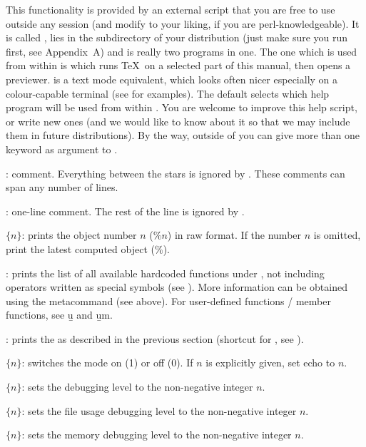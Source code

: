  This functionality is provided by an
external  script that you are free to use outside any  session
(and modify to your liking, if you are perl-knowledgeable). It is called
, lies in the  subdirectory of your distribution
(just make sure you run  first, see Appendix~A) and is
really two programs in one. The one which is used from within  is
 which runs \TeX\ on a selected part of this manual, then opens
a previewer.  is a text mode equivalent, which looks
often nicer especially on a colour-capable terminal (see
 for examples). The default  selects which
help program will be used from within . You are welcome to improve this
help script, or write new ones (and we would like to know about it
so that we may include them in future distributions). By the way, outside
of  you can give more than one keyword as argument to .

: comment. Everything between the stars is ignored by
. These comments can span any number of lines.

\subseckbd{\bs\bs}: one-line comment. The rest of the line
is ignored by .

 $\{n\}$: prints the object number $n$ ($\%n$)
in raw format. If the number $n$ is omitted, print the latest computed object
($\%$). \label{se:history}

: prints the list of all available
hardcoded functions under , not including operators written as special
symbols (see ). More information can be obtained using
the  metacommand (see above). For user-defined functions / member
functions, see \b{u} and \b{um}.

: prints the  as described in the
previous section (shortcut for , see ).

 $\{n\}$: switches the  mode on (1) or off (0). If
$n$ is explicitly given, set echo to $n$.

 $\{n\}$: sets the debugging level  to the
non-negative integer $n$.

 $\{n\}$: sets the file usage debugging level 
to the non-negative integer $n$.

 $\{n\}$: sets the memory debugging level 
to the non-negative integer $n$.

